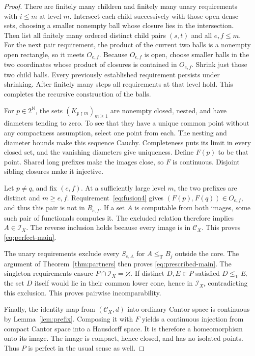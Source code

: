 \documentclass[11pt,a4paper]{article}
\newcommand{\N}{\mathbb N}
\newcommand{\leT}{\leq_{\mathrm T}}
\newcommand{\CD}{\mathcal C}
\newcommand{\core}{\mathcal I}
\newcommand{\restr}{\mathbin\upharpoonright}
\theoremstyle{definition}\newtheorem{definition}[theorem]{Definition}
\theoremstyle{remark}\newtheorem{remark}[theorem]{Remark}
\begin{document}
\begin{proof}
There are finitely many children and finitely many unary requirements with
$i\le m$ at level $m$. Intersect each child successively with those open dense
sets, choosing a smaller nonempty ball whose closure lies in the intersection.
Then list all finitely many ordered distinct child pairs $(s,t)$ and all
$e,f\le m$. For the next pair requirement, the product of the current two
balls is a nonempty open rectangle, so it meets $O_{e,f}$. Because $O_{e,f}$
is open, choose smaller balls in the two coordinates whose product of
closures is contained in $O_{e,f}$. Shrink just those two child balls. Every
previously established requirement persists under shrinking. After finitely
many steps all requirements at that level hold. This completes the recursive
construction of the balls.

For $p\in2^{\N}$, the sets $(K_{p\restr m})_{m\ge1}$ are nonempty closed,
nested, and have diameters tending to zero. To see that they have a unique
common point without any compactness assumption, select one point from each.
The nesting and diameter bounds make this sequence Cauchy. Completeness puts
its limit in every closed set, and the vanishing diameters give uniqueness.
Define $F(p)$ to be that point. Shared long prefixes make the images close,
so $F$ is continuous. Disjoint sibling closures make it injective.

Let $p\ne q$, and fix $(e,f)$. At a sufficiently large level $m$, the two
prefixes are distinct and $m\ge e,f$. Requirement~\eqref{eq:fusion4} gives
$(F(p),F(q))\in O_{e,f}$, and thus this pair is not in $R_{e,f}$. If a set $A$
is computable from both images, some such pair of functionals computes it.
The excluded relation therefore implies $A\in\core_X$. The reverse inclusion
holds because every image is in $\CD_X$. This proves
\eqref{eq:perfect-main}.

The unary requirements exclude every $S_{e,A}$ for $A\leT B_j$ outside the
core. The argument of Theorem~\ref{thm:partners} then proves
\eqref{eq:prescribed-main}. The singleton requirements ensure
$P\cap\core_X=\varnothing$. If distinct $D,E\in P$ satisfied $D\leT E$, the
set $D$ itself would lie in their common lower cone, hence in $\core_X$,
contradicting this exclusion. This proves pairwise incomparability.

Finally, the identity map from $(\CD_X,d)$ into ordinary Cantor space is
continuous by Lemma~\ref{lem:prefix}. Composing it with $F$ yields a continuous
injection from compact Cantor space into a Hausdorff space. It is therefore a
homeomorphism onto its image. The image is compact, hence closed, and has no
isolated points. Thus $P$ is perfect in the usual sense as well.
\end{proof}
\end{document}
